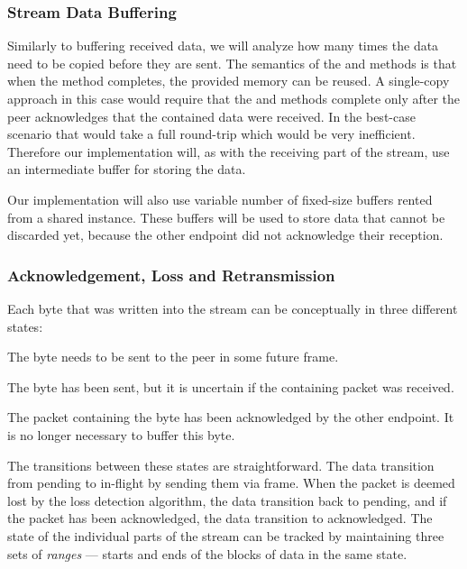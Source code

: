 
\subsubsection{Stream Data Buffering}

Similarly to buffering received data, we will analyze how many times the data need to be copied
before they are sent. The semantics of the  and  methods is that
when the method completes, the provided memory can be reused.  A
single-copy approach in this case would require that the  and 
methods complete only after the peer acknowledges that the contained data were received. In the
best-case scenario that would take a full round-trip which would be very inefficient. Therefore our
implementation will, as with the receiving part of the stream, use an intermediate buffer for
storing the data.

Our implementation will also use variable number of fixed-size buffers rented from a shared
 instance. These buffers will be used to store data that cannot be discarded
yet, because the other endpoint did not acknowledge their reception.

\subsubsection{Acknowledgement, Loss and Retransmission}

Each byte that was written into the stream can be conceptually in three different states:

\begin{itemize}

   The byte needs to be sent to the peer in some future \STREAM{} frame.

   The byte has been sent, but it is uncertain if the containing packet was
received.

   The packet containing the byte has been acknowledged by the other endpoint. It is no longer necessary to buffer this byte.

\end{itemize}

The transitions between these states are straightforward. The data transition from pending to
in-flight by sending them via \STREAM{} frame. When the packet is deemed lost by the loss detection
algorithm, the data transition back to pending, and if the packet has been acknowledged, the data
transition to acknowledged. The state of the individual parts of the stream can be tracked by
maintaining three sets of \textit{ranges} --- starts and ends of the blocks of data in the same state.

